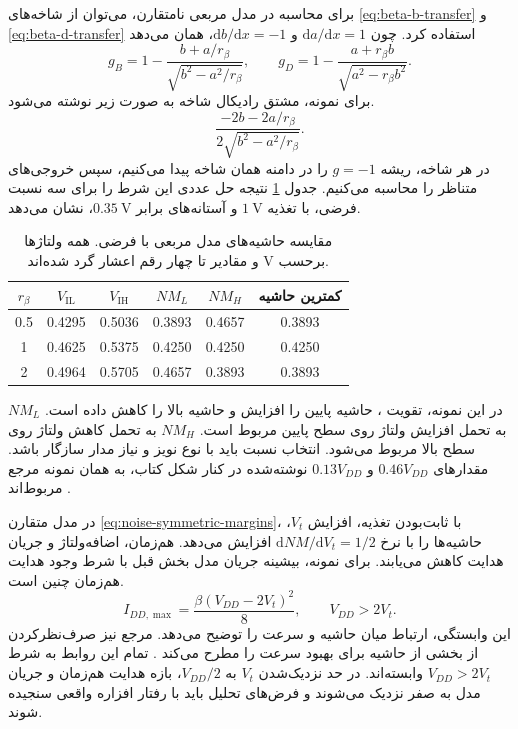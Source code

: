 برای محاسبه در مدل مربعی نامتقارن، می‌توان از شاخه‌های
\eqref{eq:beta-b-transfer} و \eqref{eq:beta-d-transfer} استفاده
کرد. چون \(\mathrm{d}a/\mathrm{d}x=1\) و
\(\mathrm{d}b/\mathrm{d}x=-1\)، همان  می‌دهد
\begin{equation}
 g_B=1-\frac{b+a/r_\beta}{\sqrt{b^2-a^2/r_\beta}},\qquad
 g_D=1-\frac{a+r_\beta b}{\sqrt{a^2-r_\beta b^2}}.
 \label{eq:noise-skew-slopes}
\end{equation}
برای نمونه، مشتق رادیکال شاخه  به صورت زیر نوشته می‌شود.
\[
 \frac{-2b-2a/r_\beta}{2\sqrt{b^2-a^2/r_\beta}}.
\]
در هر شاخه، ریشه \(g=-1\) را در دامنه همان شاخه پیدا
می‌کنیم، سپس خروجی‌های متناظر را محاسبه می‌کنیم.
جدول \ref{tab:noise-skew-example} نتیجه حل عددی این شرط را
برای سه نسبت فرضی، با تغذیه \(\qty{1}{\volt}\) و آستانه‌های
برابر \(\qty{0.35}{\volt}\)، نشان می‌دهد.
\begin{table}[!htbp]
\centering
\small
\caption{مقایسه حاشیه‌های مدل مربعی با  فرضی.
همه ولتاژها برحسب \(\unit{\volt}\) و مقادیر تا چهار رقم اعشار گرد شده‌اند.}
\label{tab:noise-skew-example}
\begin{tabular}{cccccc}
\toprule
\(r_\beta\) & \(V_{\mathrm{IL}}\) & \(V_{\mathrm{IH}}\) &
\(NM_L\) & \(NM_H\) & کمترین حاشیه\\
\midrule
\num{0.5} & \num{0.4295} & \num{0.5036} & \num{0.3893} & \num{0.4657} & \num{0.3893}\\
\num{1} & \num{0.4625} & \num{0.5375} & \num{0.4250} & \num{0.4250} & \num{0.4250}\\
\num{2} & \num{0.4964} & \num{0.5705} & \num{0.4657} & \num{0.3893} & \num{0.3893}\\
\bottomrule
\end{tabular}
\end{table}
در این نمونه، تقویت ، حاشیه پایین را افزایش و حاشیه
بالا را کاهش داده است. \(NM_L\) به تحمل افزایش ولتاژ روی سطح
پایین مربوط است. \(NM_H\) به تحمل کاهش ولتاژ روی سطح بالا
مربوط می‌شود. انتخاب نسبت باید با نوع نویز و نیاز مدار سازگار باشد.
مقدارهای \(0.46V_{DD}\) و \(0.13V_{DD}\) نوشته‌شده در کنار
شکل  کتاب، به همان نمونه مرجع مربوط‌اند
\cite[صفحه ۹۲]{weste}.

در مدل متقارن \eqref{eq:noise-symmetric-margins}، با ثابت‌بودن
تغذیه، افزایش \(V_t\)، حاشیه‌ها را با نرخ
\(\mathrm{d}NM/\mathrm{d}V_t=1/2\) افزایش می‌دهد.
هم‌زمان، اضافه‌ولتاژ و جریان هدایت کاهش می‌یابند.
برای نمونه، بیشینه جریان مدل بخش قبل با شرط وجود هدایت هم‌زمان چنین است.
\[
 I_{DD,\max}=\frac{\beta(V_{DD}-2V_t)^2}{8},\qquad V_{DD}>2V_t.
\]
این وابستگی، ارتباط میان حاشیه و سرعت را توضیح می‌دهد.
مرجع نیز صرف‌نظرکردن از بخشی از حاشیه برای بهبود سرعت را
مطرح می‌کند \cite[صفحه ۹۲]{weste}.
تمام این روابط به شرط \(V_{DD}>2V_t\) وابسته‌اند.
در حد نزدیک‌شدن \(V_t\) به \(V_{DD}/2\)، بازه هدایت هم‌زمان
و جریان مدل به صفر نزدیک می‌شوند و فرض‌های تحلیل باید با
رفتار افزاره واقعی سنجیده شوند.

